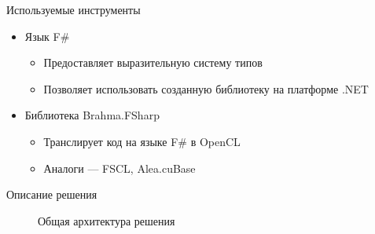 \documentclass{beamer}
\begin{document}
\begin{frame}{Используемые инструменты}
    
    \begin{itemize}
        \item Язык F\#
        \begin{itemize}
            \item Предоставляет выразительную систему типов
            \item Позволяет использовать созданную библиотеку на платформе .NET
        \end{itemize}
        \item Библиотека Brahma.FSharp
        \begin{itemize}
            \item Транслирует код на языке F\# в OpenCL
            \item Аналоги --- FSCL, Alea.cuBase
        \end{itemize}
    \end{itemize}
    
\end{frame}

\begin{frame}{Описание решения}

\begin{figure}[h]
\caption{Общая архитектура решения}
\end{figure}

\end{frame}
\end{document}
